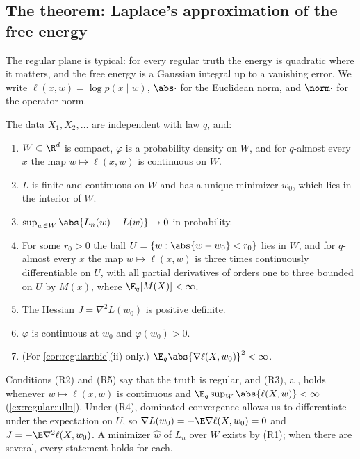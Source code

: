 \begin{refsection}
\section{The theorem: Laplace's approximation of the free energy}\label{sec:regular:laplace}

The regular plane is typical: for every regular truth the energy is quadratic where it matters, and the free energy is a Gaussian integral up to a vanishing error. We write $\ell(x,w)=\log p(x\mid w)$, $\abs\cdot$ for the Euclidean norm, and $\norm\cdot$ for the operator norm.

\begin{assumption}[Regularity]\label{ass:regular:laplace}
The data $X_1,X_2,\dots$ are independent with law $q$, and:
\begin{enumerate}[label=(R\arabic*),leftmargin=*]
\item $W\subset\R^d$ is compact, $\varphi$ is a probability density on $W$, and for $q$-almost every $x$ the map $w\mapsto\ell(x,w)$ is continuous on $W$.
\item $L$ is finite and continuous on $W$ and has a unique minimizer $w_0$, which lies in the interior of $W$.
\item $\sup_{w\in W}\abs{L_n(w)-L(w)}\to0$ in probability.
\item For some $r_0>0$ the ball $U=\{w:\abs{w-w_0}<r_0\}$ lies in $W$, and for $q$-almost every $x$ the map $w\mapsto\ell(x,w)$ is three times continuously differentiable on $U$, with all partial derivatives of orders one to three bounded on $U$ by $M(x)$, where $\E_q[M(X)]<\infty$.
\item The Hessian $J=\nabla^2L(w_0)$ is positive definite.
\item $\varphi$ is continuous at $w_0$ and $\varphi(w_0)>0$.
\item (For \cref{cor:regular:bic}(ii) only.) $\E_q\abs{\nabla\ell(X,w_0)}^2<\infty$.
\end{enumerate}
\end{assumption}

Conditions (R2) and (R5) say that the truth is regular, and (R3), a , holds whenever $w\mapsto\ell(x,w)$ is continuous and $\E_q\sup_W\abs{\ell(X,w)}<\infty$ (\cref{ex:regular:ulln}). Under (R4), dominated convergence allows us to differentiate under the expectation on $U$, so $\nabla L(w_0)=-\E\nabla\ell(X,w_0)=0$ and $J=-\E\nabla^2\ell(X,w_0)$. A minimizer $\hat w$ of $L_n$ over $W$ exists by (R1); when there are several, every statement holds for each.


\end{refsection}
